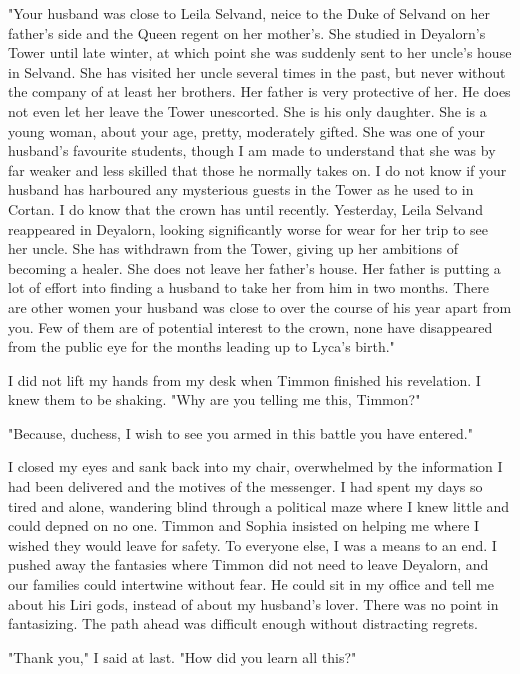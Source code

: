 \documentclass{article}
\begin{document}
"Your husband was close to Leila Selvand, neice to the Duke of Selvand on her father's side and the Queen regent on her mother's. She studied in Deyalorn's Tower until late winter, at which point she was suddenly sent to her uncle's house in Selvand. She has visited her uncle several times in the past, but never without the company of at least her brothers. Her father is very protective of her. He does not even let her leave the Tower unescorted. She is his only daughter. She is a young woman, about your age, pretty, moderately gifted. She was one of your husband's favourite students, though I am made to understand  that she was by far weaker and less skilled that those he normally takes on. I do not know if your husband has harboured any mysterious guests in the Tower as he used to in Cortan. I do know that the crown has until recently. Yesterday, Leila Selvand reappeared in Deyalorn, looking significantly worse for wear for her trip to see her uncle. She has withdrawn from the Tower, giving up her ambitions of becoming a healer. She does not leave her father's house. Her father is putting a lot of effort into finding a husband to take her from him in two months. There are other women your husband was close to over the course of his year apart from you. Few of them are of potential interest to the crown, none have disappeared from the public eye for the months leading up to Lyca's birth."

I did not lift my hands from my desk when Timmon finished his revelation. I knew them to be shaking. "Why are you telling me this, Timmon?"

"Because, duchess, I wish to see you armed in this battle you have entered."

I closed my eyes and sank back into my chair, overwhelmed by the information I had been delivered and the motives of the messenger. I had spent my days so tired and alone, wandering blind through a political maze where I knew little and could depned on no one. Timmon and Sophia insisted on helping me where I wished they would leave for safety. To everyone else, I was a means to an end. I pushed away the fantasies where Timmon did not need to leave Deyalorn, and our families could intertwine without fear. He could sit in my office and tell me about his Liri gods, instead of about my husband's lover. There was no point in fantasizing. The path ahead was difficult enough without distracting regrets. 

"Thank you," I said at last. "How did you learn all this?"
\end{document}
